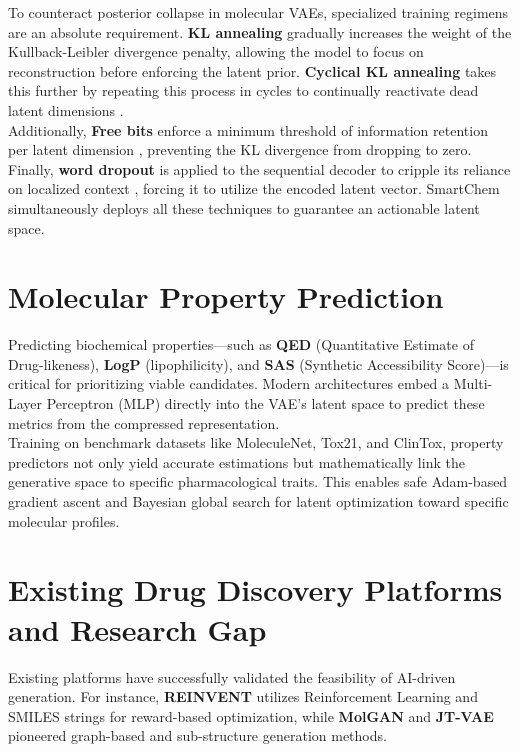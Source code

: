 \documentclass[12pt,a4paper]{report}
\begin{document}
To counteract posterior collapse in molecular VAEs, specialized training regimens are an absolute requirement. \textbf{KL annealing} gradually increases the weight of the Kullback-Leibler divergence penalty, allowing the model to focus on reconstruction before enforcing the latent prior. \textbf{Cyclical KL annealing} takes this further by repeating this process in cycles to continually reactivate dead latent dimensions \cite{fu2019}.\\

Additionally, \textbf{Free bits} enforce a minimum threshold of information retention per latent dimension \cite{kingma2016}, preventing the KL divergence from dropping to zero. Finally, \textbf{word dropout} is applied to the sequential decoder to cripple its reliance on localized context \cite{bowman2016}, forcing it to utilize the encoded latent vector. SmartChem simultaneously deploys all these techniques to guarantee an actionable latent space.

\section{Molecular Property Prediction}

Predicting biochemical properties—such as \textbf{QED} (Quantitative Estimate of Drug-likeness), \textbf{LogP} (lipophilicity), and \textbf{SAS} (Synthetic Accessibility Score)—is critical for prioritizing viable candidates. Modern architectures embed a Multi-Layer Perceptron (MLP) directly into the VAE's latent space to predict these metrics from the compressed representation.\\

Training on benchmark datasets like MoleculeNet, Tox21, and ClinTox, property predictors not only yield accurate estimations but mathematically link the generative space to specific pharmacological traits. This enables safe Adam-based gradient ascent and Bayesian global search for latent optimization toward specific molecular profiles.

\section{Existing Drug Discovery Platforms and Research Gap}

Existing platforms have successfully validated the feasibility of AI-driven generation. For instance, \textbf{REINVENT} utilizes Reinforcement Learning and SMILES strings for reward-based optimization, while \textbf{MolGAN} and \textbf{JT-VAE} pioneered graph-based and sub-structure generation methods.\\
\end{document}

